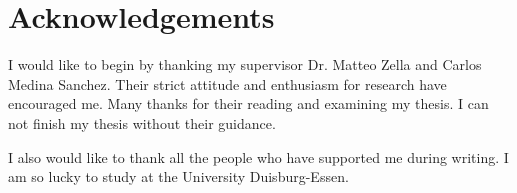 \chapter{Acknowledgements}



I would like to begin by thanking my supervisor Dr. Matteo Zella and Carlos Medina Sanchez. Their strict attitude and enthusiasm for research have encouraged me. Many thanks for their reading and examining my thesis. I can not finish my thesis without their guidance.

I also would like to thank all the people who have supported me during writing. I am so lucky to study at the University Duisburg-Essen.